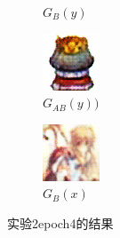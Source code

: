 \documentclass{beamer}
\begin{document}
\begin{frame}
\begin{figure}[htb]
\begin{subfigure}[b]{0.23\linewidth}
        \caption{$G_B(y)$}
      \end{subfigure}
      \begin{subfigure}[b]{0.23\linewidth}
        \includegraphics[width=\linewidth]{exp2_epoch004_rec_B.png}
        \caption{$G_{AB}(y))$}
      \end{subfigure}
      \begin{subfigure}[b]{0.23\linewidth}
        \includegraphics[width=\linewidth]{exp2_epoch004_idt_B.png}
        \caption{$G_B(x)$}
      \end{subfigure}
      \caption{实验2epoch4的结果}
      \label{fig:exp2epoch4}
\end{figure}

\end{frame}
\end{document}
